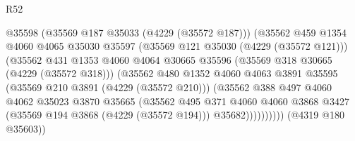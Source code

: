 \begin{lexlean}{R52}
\begin{coremodule}
                                            @35598
                                            (@35569 @187 @35033 (@4229 (@35572 @187)))
                                            (@35562
                                              @459
                                              @1354
                                              @4060
                                              @4065
                                              @35030
                                              @35597
                                              (@35569 @121 @35030 (@4229 (@35572 @121)))
                                              (@35562
                                                @431
                                                @1353
                                                @4060
                                                @4064
                                                @30665
                                                @35596
                                                (@35569 @318 @30665 (@4229 (@35572 @318)))
                                                (@35562
                                                  @480
                                                  @1352
                                                  @4060
                                                  @4063
                                                  @3891
                                                  @35595
                                                  (@35569 @210 @3891 (@4229 (@35572 @210)))
                                                  (@35562
                                                    @388
                                                    @497
                                                    @4060
                                                    @4062
                                                    @35023
                                                    @3870
                                                    @35665
                                                    (@35562
                                                      @495
                                                      @371
                                                      @4060
                                                      @4060
                                                      @3868
                                                      @3427
                                                      (@35569 @194 @3868 (@4229 (@35572 @194)))
                                                      @35682))))))))))
                                  (@4319 @180 @35603))

\end{coremodule}
\end{lexlean}
